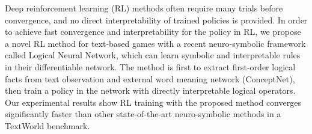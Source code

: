 Deep reinforcement learning (RL) methods often require many trials before convergence, and no direct interpretability of trained policies is provided. In order to achieve fast convergence and interpretability for the policy in RL, we propose a novel RL method for text-based games with a recent neuro-symbolic framework called Logical Neural Network, which can learn symbolic and interpretable rules in their differentiable network. The method is first to extract first-order logical facts from text observation and external word meaning network (ConceptNet), then train a policy in the network with directly interpretable logical operators. Our experimental results show RL training with the proposed method converges significantly faster than other state-of-the-art neuro-symbolic methods in a TextWorld benchmark.
